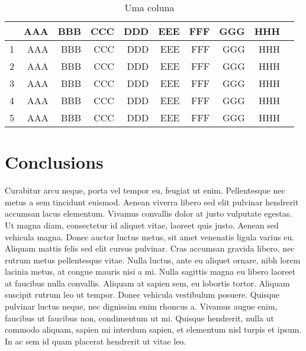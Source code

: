 \documentclass{genos-technical-report}
\begin{document}
\begin{table*}
  \centering
  \begin{tabular}{l|rrrrrrrrr}
    & AAA & BBB & CCC & DDD & EEE & FFF & GGG & HHH \\
    \hline
    1 & AAA & BBB & CCC & DDD & EEE & FFF & GGG & HHH \\
    2 & AAA & BBB & CCC & DDD & EEE & FFF & GGG & HHH \\
    3 & AAA & BBB & CCC & DDD & EEE & FFF & GGG & HHH \\
    4 & AAA & BBB & CCC & DDD & EEE & FFF & GGG & HHH \\
    5 & AAA & BBB & CCC & DDD & EEE & FFF & GGG & HHH \\
  \end{tabular}
  \caption{Uma coluna}
  \label{tab:one}
\end{table*}

\section{Conclusions}
\label{sec:conclusions}

Curabitur arcu neque, porta vel tempor eu, feugiat ut
enim. Pellentesque nec metus a sem tincidunt euismod. Aenean viverra
libero sed elit pulvinar hendrerit accumsan lacus elementum. Vivamus
convallis dolor at justo vulputate egestas. Ut magna diam, consectetur
id aliquet vitae, laoreet quis justo. Aenean sed vehicula magna. Donec
auctor luctus metus, sit amet venenatis ligula varius eu. Aliquam
mattis felis sed elit cursus pulvinar. Cras accumsan gravida libero,
nec rutrum metus pellentesque vitae. Nulla luctus, ante eu aliquet
ornare, nibh lorem lacinia metus, at congue mauris nisi a mi. Nulla
sagittis magna eu libero laoreet at faucibus nulla convallis. Aliquam
at sapien sem, eu lobortis tortor. Aliquam suscipit rutrum leo ut
tempor. Donec vehicula vestibulum posuere. Quisque pulvinar luctus
neque, nec dignissim enim rhoncus a. Vivamus augue enim, faucibus ut
faucibus non, condimentum ut mi. Quisque hendrerit, nulla ut commodo
aliquam, sapien mi interdum sapien, et elementum nisl turpis et
ipsum. In ac sem id quam placerat hendrerit ut vitae leo.

\nocite{sampaio.ea10:musicontour}



\end{document}
